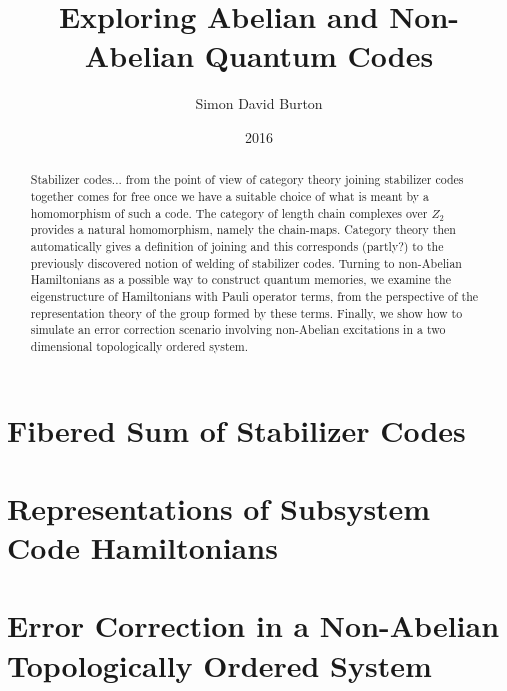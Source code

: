 \documentclass[11pt,twoside,openright]{report}
\title{Exploring Abelian and Non-Abelian Quantum Codes}
\author{Simon David Burton}
\date{2016}
\begin{document}
\maketitle

\doublespacing

\declaration

\dedication{To my friends}

\begin{abstract}
Stabilizer codes... 
from the point of view of category theory
joining stabilizer codes together comes for free once
we have a suitable choice of what is meant by a
homomorphism of such a code. The category of
length chain complexes over $Z_2$ provides a natural
homomorphism, namely the chain-maps. Category theory
then automatically gives a definition of joining and
this corresponds (partly?) to the previously
discovered notion of welding of stabilizer codes.
Turning to non-Abelian Hamiltonians as a possible
way to construct quantum memories, we examine the
eigenstructure of Hamiltonians with Pauli operator
terms, from the perspective of the representation 
theory of the group formed by these terms.
Finally, we show how to simulate an error
correction scenario involving non-Abelian
excitations in a two dimensional topologically
ordered system.
\end{abstract}

\tableofcontents

\chapter{Fibered Sum of Stabilizer Codes}


%


\chapter{Representations of Subsystem Code Hamiltonians}





\chapter{Error Correction in a Non-Abelian Topologically Ordered System}







{}

\end{document}
